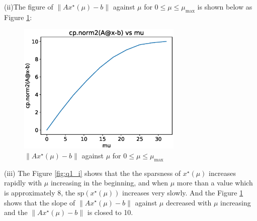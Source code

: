 \documentclass[a4paper,11pt,reqno]{amsart}
\begin{document}
(ii)The figure of $\left\lVert Ax^{\star}(\mu) - b\right\rVert$ against $\mu$ for $0 \leq \mu \leq \mu_{\mathrm{max}}$ is shown below as Figure \ref{fig:q1_ii}:
\begin{figure}[H]
    \centering
    \includegraphics[width=0.7\textwidth]{figures/q1_ii.eps}
    \caption{$\left\lVert Ax^{\star}(\mu) - b\right\rVert$ against $\mu$ for $0 \leq \mu \leq \mu_{\mathrm{max}}$}
    \label{fig:q1_ii}
\end{figure}

(iii)
The Figure \ref{fig:q1_i} shows that the the sparsness of $x^{\star}(\mu)$ increases rapidly with $\mu$ increasing in the beginning, and when $\mu$ more than a value which is approximately 8, the $\mathrm{sp}(x^{\star}(\mu))$ increases very slowly.
And the Figure \ref{fig:q1_ii} shows that the slope of $\left\lVert Ax^{\star}(\mu) - b\right\rVert$ against $\mu$ decreased with $\mu$ increasing and the $\left\lVert Ax^{\star}(\mu) - b\right\rVert$ is closed to 10.

\end{document}
